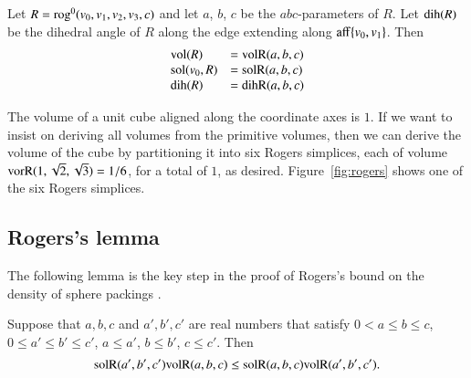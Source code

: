 \begin{lemma}\label{lemma:rog:abc} 
Let $R={\operatorname{rog}}^0(v_0,v_1,v_2,v_3,c)$ and let $a$, $b$,
$c$ be the $abc$-parameters of $R$.  Let ${\operatorname{dih}}(R)$ be the dihedral
angle of $R$ along the edge extending along ${\operatorname{aff}}\{v_0,v_1\}$.  Then
$$
\begin{array}{lll}
{\operatorname{vol}}(R) &= {\operatorname{volR}}(a,b,c)\\
{\operatorname{sol}}(v_0,R) &= {\operatorname{solR}}(a,b,c)\\
{\operatorname{dih}}(R) &= {\operatorname{dihR}}(a,b,c)\\
\end{array}
$$
\end{lemma}





\begin{remark}
The volume of a unit cube aligned along the coordinate axes is $1$.  
If we want to insist on deriving all volumes from the primitive
volumes, then we can derive the volume of the cube by partitioning
it into six Rogers simplices,
each of volume ${\operatorname{vorR}}(1,\sqrt2,\sqrt3) = 1/6$, for a total
of $1$, as desired.  Figure~\ref{fig:rogers} shows one of the six
Rogers simplices.
\end{remark}



\subsection{Rogers's lemma}


The following lemma is the key step in the proof of Rogers's
bound on the density of sphere packings \cite{Rog58}.

\begin{lemma} 
Suppose that $a,b,c$ and $a',b',c'$
are real numbers that satisfy $0 <a \le b \le c$, $0 \le a'\le b'\le c'$,
$a \le a'$, $b \le b'$, $c \le c'$. Then
  $$
  {\operatorname{solR}}(a',b',c'){\operatorname{volR}}(a,b,c) \le {\operatorname{solR}}(a,b,c){\operatorname{volR}}(a',b',c').
  $$
\end{lemma}


